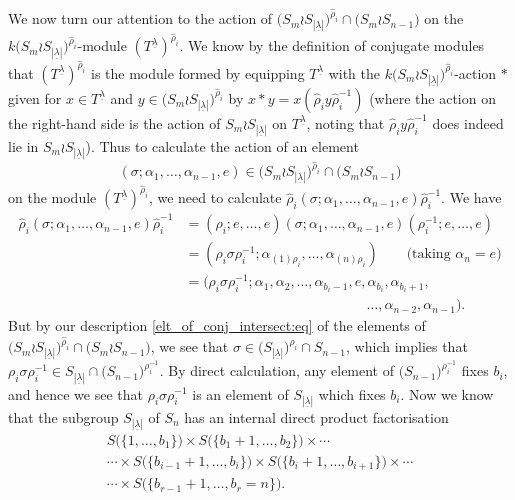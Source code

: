 \documentclass[ALCO,Unicode,published]{cedram}
\newcommand{\ul}[1]{\underline{#1}}
\begin{document}
We now turn our attention to the action of
$\bigl(S_m \wr S_{|\ul{\lambda}|}\bigr)^{\hat\rho_i}\cap\bigl(S_m \wr S_{n-1}\bigr)$
on the
$k\bigl(S_m \wr S_{|\ul{\lambda}|}\bigr)^{\hat\rho_i}$-module $\left(T^{\ul{\lambda}}\right)^{\hat\rho_i}$.
We know by the definition of conjugate modules that $\left(T^{\ul{\lambda}}\right)^{\hat\rho_i}$ is the module formed by equipping
$T^{\ul{\lambda}}$ with the $k\bigl(S_m \wr S_{|\ul{\lambda}|}\bigr)^{\hat\rho_i}$-action $\ast$ given for $x \in T^{\ul{\lambda}}$ and
$y \in \bigl(S_m \wr S_{|\ul{\lambda}|}\bigr)^{\hat\rho_i}$ by $x \ast y = x (\hat\rho_iy\hat\rho_i^{-1})$ (where the action on the
right-hand side is the action of $S_m \wr S_{|\ul{\lambda}|}$ on $T^{\ul{\lambda}}$, noting that $\hat\rho_iy\hat\rho_i^{-1}$ does indeed
lie in $S_m \wr S_{|\ul{\lambda}|}$). Thus to calculate the action of an element
\[(\sigma;\alpha_1,\ldots,\alpha_{n-1},e) \in \bigl(S_m \wr S_{|\ul{\lambda}|}\bigr)^{\hat\rho_i}\cap\bigl(S_m \wr S_{n-1}\bigr)\]
on the module $\left(T^{\ul{\lambda}}\right)^{\hat\rho_i}$, we need to calculate
$\hat\rho_i(\sigma;\alpha_1,\ldots,\alpha_{n-1},e)\hat\rho_i^{-1}$. We have
\begin{align*}
\hat\rho_i(\sigma;\alpha_1,\ldots,\alpha_{n-1},e)\hat\rho_i^{-1}
&= (\rho_i;e,\ldots,e)(\sigma;\alpha_1,\ldots,\alpha_{n-1},e)(\rho_i^{-1};e,\ldots,e)\\
&= (\rho_i\sigma\rho_i^{-1};\alpha_{(1)\rho_i},\ldots,\alpha_{(n)\rho_i})\qquad \text{(taking $\alpha_n = e$)}\\
&= (\rho_i\sigma\rho_i^{-1};\alpha_1,\alpha_2,\ldots,\alpha_{b_i-1},e,\alpha_{b_i},\alpha_{b_i+1},\\
&\hspace{13em}\ldots,\alpha_{n-2},\alpha_{n-1}).
\end{align*}
But by our description \eqref{elt_of_conj_intersect:eq} of the elements of
$\bigl(S_m \wr S_{|\ul{\lambda}|}\bigr)^{\hat\rho_i}\cap\bigl(S_m \wr S_{n-1}\bigr)$, we see that
$\sigma \in \bigl(S_{|\ul{\lambda}|}\bigr)^{\rho_i}\cap S_{n-1}$, which implies that
$\rho_i\sigma\rho_i^{-1} \in S_{|\ul{\lambda}|}\cap \bigl(S_{n-1}\bigr)^{\rho^{-1}_i}$. By direct calculation, any element of
$\bigl(S_{n-1}\bigr)^{\rho^{-1}_i}$ fixes $b_i$, and hence we see that $\rho_i\sigma\rho_i^{-1}$ is an element of
$S_{|\ul{\lambda}|}$ which fixes $b_i$.
Now we know that the subgroup $S_{|\ul{\lambda}|}$ of $S_n$ has an internal direct product factorisation
\begin{multline*}
S\bigl(\{1,\ldots,b_1\}\bigr) \times S\bigl(\{b_1+1,\ldots,b_2\}\bigr) \times \cdots\\
\cdots\times S\bigl(\{b_{i-1}+1,\ldots,b_i\}\bigr)\times S\bigl(\{b_i+1,\ldots,b_{i+1}\}\bigr)\times\cdots\\
\cdots \times S\bigl(\{b_{r-1}+1,\ldots,b_r = n\}\bigr).
\end{multline*}
\end{document}
